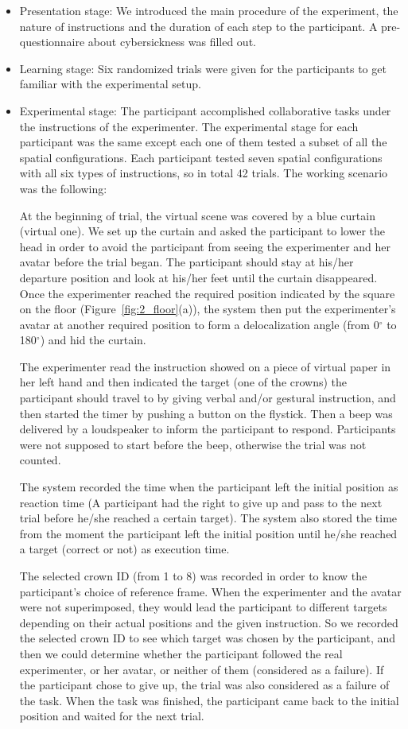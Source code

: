 \begin{itemize}
\item Presentation stage: We introduced the main procedure of the experiment, the nature of instructions and the duration of each step to the participant. A pre-questionnaire about cybersickness was filled out.
\item Learning stage: Six randomized trials were given for the participants to get familiar with the experimental setup.
\item Experimental stage: The participant accomplished collaborative tasks under the instructions of the experimenter. The experimental stage for each participant was the same except each one of them tested a subset of all the spatial configurations. Each participant tested seven spatial configurations with all six types of instructions, so in total 42 trials. The working scenario was the following:

At the beginning of trial, the virtual scene was covered by a blue curtain (virtual one). We set up the curtain and asked the participant to lower the head in order to avoid the participant from seeing the experimenter and her avatar before the trial began. The participant should stay at his/her departure position and look at his/her feet until the curtain disappeared. Once the experimenter reached the required position indicated by the square on the floor (Figure~\ref{fig:2_floor}(a)), the system then put the experimenter's avatar at another required position to form a delocalization angle (from 0$^\circ$ to 180$^\circ$) and hid the curtain.

The experimenter read the instruction showed on a piece of virtual paper in her left hand and then indicated the target (one of the crowns) the participant should travel to by giving verbal and/or gestural instruction, and then started the timer by pushing a button on the flystick. Then a beep was delivered by a loudspeaker to inform the participant to respond. Participants were not supposed to start before the beep, otherwise the trial was not counted.

The system recorded the time when the participant left the initial position as reaction time (A participant had the right to give up and pass to the next trial before he/she reached a certain target). The system also stored the time from the moment the participant left the initial position until he/she reached a target (correct or not) as execution time.

The selected crown ID (from 1 to 8) was recorded in order to know the participant's choice of reference frame. When the experimenter and the avatar were not superimposed, they would lead the participant to different targets depending on their actual positions and the given instruction. So we recorded the selected crown ID to see which target was chosen by the participant, and then we could determine whether the participant followed the real experimenter, or her avatar, or neither of them (considered as a failure). If the participant chose to give up, the trial was also considered as a failure of the task. When the task was finished, the participant came back to the initial position and waited for the next trial.


\end{itemize}
